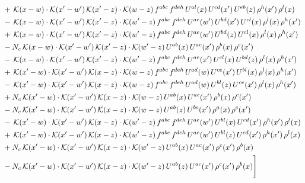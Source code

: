 \documentclass[9pt]{article}
\numberwithin{equation}{section}
\begin{document}
\begin{align}
& +\,\mathcal{K}(x-w)\cdot\mathcal{K}(x'-w')\,\mathcal{K}(x'-z)\cdot\mathcal{K}(w-z)\,f^{abc}\,f^{deh}\,U^{al}(x)\,U^{cd}(x')\,U^{eb}(z)\,\rho^{h}(x')\,\rho^{l}(x)\notag\\
& -\,\mathcal{K}(x-w)\cdot\mathcal{K}(x'-w')\,\mathcal{K}(x'-z)\cdot\mathcal{K}(w'-z)\,f^{abc}\,f^{deh}\,U^{ae}(w')\,U^{bd}(x')\,U^{cl}(x)\,\rho^{l}(x)\,\rho^{h}(x')\notag\\
& +\,\mathcal{K}(x-w)\cdot\mathcal{K}(x'-w')\,\mathcal{K}(x'-z)\cdot\mathcal{K}(w'-z)\,f^{abc}\,f^{deh}\,U^{ae}(w')\,U^{bd}(z)\,U^{cl}(x)\,\rho^{l}(x)\,\rho^{h}(x')\notag\\
& -N_{c}\,\mathcal{K}(x-w)\cdot\mathcal{K}(x'-w')\,\mathcal{K}(x'-z)\cdot\mathcal{K}(w'-z)\,U^{ab}(x)\,U^{ac}(x')\,\rho^{b}(x)\,\rho^{c}(x')\notag\\
& -\,\mathcal{K}(x-w)\cdot\mathcal{K}(x'-w')\,\mathcal{K}(x'-z)\cdot\mathcal{K}(w'-z)\,f^{abc}\,f^{deh}\,U^{ae}(x')\,U^{cl}(x)\,U^{bd}(z)\,\rho^{l}(x)\,\rho^{h}(x')\notag\\
& +\,\mathcal{K}(x'-w)\cdot\mathcal{K}(x'-w')\,\mathcal{K}(x-z)\cdot\mathcal{K}(w-z)\,f^{abc}\,f^{deh}\,U^{ad}(w)\,U^{ce}(x')\,U^{bl}(x)\,\rho^{l}(x)\,\rho^{h}(x')\notag\\
& -\,\mathcal{K}(x'-w)\cdot\mathcal{K}(x'-w')\,\mathcal{K}(x-z)\cdot\mathcal{K}(w-z)\,f^{abc}\,f^{deh}\,U^{ad}(w)\,U^{bl}(z)\,U^{ce}(x')\,\rho^{l}(x)\,\rho^{h}(x')\notag\\
& +N_{c}\,\mathcal{K}(x'-w)\cdot\mathcal{K}(x'-w')\,\mathcal{K}(x-z)\cdot\mathcal{K}(w-z)\,U^{ab}(x)\,U^{ac}(x')\,\rho^{b}(x)\,\rho^{c}(x')\notag\\
& -N_{c}\,\mathcal{K}(x'-w)\cdot\mathcal{K}(x'-w')\,\mathcal{K}(x-z)\cdot\mathcal{K}(w-z)\,U^{ab}(z)\,U^{bc}(x')\,\rho^{a}(x)\,\rho^{c}(x')\notag\\
& -\,\mathcal{K}(x'-w)\cdot\mathcal{K}(x'-w')\,\mathcal{K}(x-z)\cdot\mathcal{K}(w'-z)\,f^{abc}\,f^{deh}\,U^{ae}(w')\,U^{bl}(x)\,U^{cd}(x')\,\rho^{h}(x')\,\rho^{l}(x)\notag\\
& +\,\mathcal{K}(x'-w)\cdot\mathcal{K}(x'-w')\,\mathcal{K}(x-z)\cdot\mathcal{K}(w'-z)\,f^{abc}\,f^{deh}\,U^{ae}(w')\,U^{bl}(z)\,U^{cd}(x')\,\rho^{h}(x')\,\rho^{l}(x)\notag\\
& +N_{c}\,\mathcal{K}(x'-w)\cdot\mathcal{K}(x'-w')\,\mathcal{K}(x-z)\cdot\mathcal{K}(w'-z)\,U^{ab}(x)\,U^{ac}(x')\,\rho^{c}(x')\,\rho^{b}(x)\notag\\
& -N_{c}\,\mathcal{K}(x'-w)\cdot\mathcal{K}(x'-w')\,\mathcal{K}(x-z)\cdot\mathcal{K}(w'-z)\,U^{ab}(z)\,U^{ac}(x')\,\rho^{c}(x')\,\rho^{b}(x)\Bigg]
\end{align}
\end{document}
